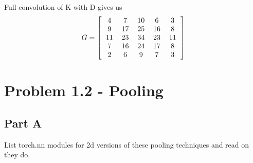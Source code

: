 \documentclass{article}
\begin{document}
Full convolution of K with D gives us 
\[ G =
\left[
\begin{tabular}{ccccc}
4 & 7 & 10 & 6 & 3 \\
9 & 17 & 25 & 16 & 8 \\
11 & 23 & 34 & 23 & 11\\
7 & 16 & 24 & 17 & 8\\
2 & 6 & 9 & 7 & 3\\
\end{tabular}
\right]
\]

\section*{Problem 1.2 - Pooling}
\subsection*{Part A}
List torch.nn modules for 2d versions of these pooling techniques and read on they do. 
\end{document}
